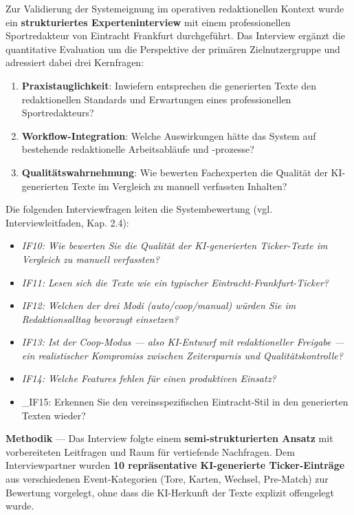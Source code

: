 Zur Validierung der Systemeignung im operativen redaktionellen Kontext
wurde ein \textbf{strukturiertes Experteninterview} mit einem
professionellen Sportredakteur von Eintracht Frankfurt durchgeführt. Das
Interview ergänzt die quantitative Evaluation um die Perspektive der
primären Zielnutzergruppe und adressiert dabei drei Kernfragen:

\begin{enumerate}
\def\labelenumi{\arabic{enumi}.}
\tightlist
\item
  \textbf{Praxistauglichkeit}: Inwiefern entsprechen die generierten
  Texte den redaktionellen Standards und Erwartungen eines
  professionellen Sportredakteurs?
\item
  \textbf{Workflow-Integration}: Welche Auswirkungen hätte das System
  auf bestehende redaktionelle Arbeitsabläufe und -prozesse?
\item
  \textbf{Qualitätswahrnehmung}: Wie bewerten Fachexperten die Qualität
  der KI-generierten Texte im Vergleich zu manuell verfassten Inhalten?
\end{enumerate}

Die folgenden Interviewfragen leiten die Systembewertung (vgl.
Interviewleitfaden, Kap. 2.4):

\begin{itemize}
\tightlist
\item
  \emph{IF10: Wie bewerten Sie die Qualität der KI-generierten
  Ticker-Texte im Vergleich zu manuell verfassten?}
\item
  \emph{IF11: Lesen sich die Texte wie ein typischer
  Eintracht-Frankfurt-Ticker?}
\item
  \emph{IF12: Welchen der drei Modi (auto/coop/manual) würden Sie im
  Redaktionsalltag bevorzugt einsetzen?}
\item
  \emph{IF13: Ist der Coop-Modus --- also KI-Entwurf mit redaktioneller
  Freigabe --- ein realistischer Kompromiss zwischen Zeitersparnis und
  Qualitätskontrolle?}
\item
  \emph{IF14: Welche Features fehlen für einen produktiven Einsatz?}
\item
  \_IF15: Erkennen Sie den vereinsspezifischen Eintracht-Stil in den
  generierten Texten wieder?
\end{itemize}

\textbf{Methodik} --- Das Interview folgte einem
\textbf{semi-strukturierten Ansatz} mit vorbereiteten Leitfragen und
Raum für vertiefende Nachfragen. Dem Interviewpartner wurden \textbf{10
repräsentative KI-generierte Ticker-Einträge} aus verschiedenen
Event-Kategorien (Tore, Karten, Wechsel, Pre-Match) zur Bewertung
vorgelegt, ohne dass die KI-Herkunft der Texte explizit offengelegt
wurde.

